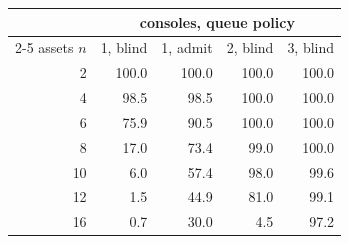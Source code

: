 \begin{tabular}{rrrrr}
\toprule
& \multicolumn{4}{c}{consoles, queue policy} \\
\cmidrule(lr){2-5}
assets $n$ & 1, blind & 1, admit & 2, blind & 3, blind \\
\midrule
2 & 100.0 & 100.0 & 100.0 & 100.0 \\
4 & 98.5 & 98.5 & 100.0 & 100.0 \\
6 & 75.9 & 90.5 & 100.0 & 100.0 \\
8 & 17.0 & 73.4 & 99.0 & 100.0 \\
10 & 6.0 & 57.4 & 98.0 & 99.6 \\
12 & 1.5 & 44.9 & 81.0 & 99.1 \\
16 & 0.7 & 30.0 & 4.5 & 97.2 \\
\bottomrule
\end{tabular}
